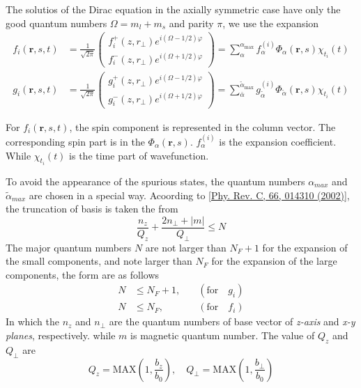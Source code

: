   The solutios of the Dirac equation in the axially symmetric case have only the good quantum numbers $\Omega = m_l + m_s$ and parity $\pi$, we use the expansion
  \begin{align}
      f_{i}(\boldsymbol{r}, s, t) &= \frac{1}{\sqrt{2 \pi}}
      \left(\begin{array}{l}
        f_{i}^{+}\left(z, r_{\perp}\right) e^{i(\Omega-1 / 2) \varphi} \\
        f_{i}^{-}\left(z, r_{\perp}\right) e^{i(\Omega+1 / 2) \varphi}
      \end{array}\right)
      =\sum_{\alpha}^{\alpha_{\max }} f_{\alpha}^{(i)} \Phi_{\alpha}(\boldsymbol{r}, s) \chi_{t_{i}}(t)  \label{oc_fi_hos} \\
      g_{i}(\boldsymbol{r}, s, t) &= \frac{1}{\sqrt{2 \pi}}
      \left(\begin{array}{l}
        g_{i}^{+}\left(z, r_{\perp}\right) e^{i(\Omega-1 / 2) \varphi} \\
        g_{i}^{-}\left(z, r_{\perp}\right) e^{i(\Omega+1 / 2) \varphi}
      \end{array}\right)
      =\sum_{\bar{\alpha}}^{\tilde{\alpha}_{\max }} g_{\tilde{\alpha}}^{(i)} \Phi_{\tilde{\alpha}}(\boldsymbol{r}, s) \chi_{t_{i}}(t) \label{oc_gi_hos}
  \end{align}
  \begin{note}
    For $f_i(\boldsymbol{r}, s, t)$, the spin component is represented in the column vector. The corresponding spin part is in the $\Phi_{\alpha}(\boldsymbol{r}, s)$. $f_{\alpha}^{(i)}$ is the expansion coefficient. While $\chi_{t_{i}}(t)$ is the time part of wavefunction.
  \end{note}
  To avoid the appearance of the spurious states, the quantum numbers $\alpha_{max}$ and $\tilde{\alpha}_{max}$ are chosen in a special way. Acoording to \href{https://journals.aps.org/prc/abstract/10.1103/PhysRevC.66.014310}{[Phy. Rev. C, 66, 014310 (2002)]}, the truncation of basis is taken the from
  \begin{equation}
    \frac{n_z}{Q_z} + \frac{2n_{\perp} + |m|}{Q_{\perp}} \leqslant N \label{oc_basis_truncate}
  \end{equation}
  The major quantum numbers $N$ are not larger than $N_F + 1$ for the expansion of the small components, and note larger than $N_F$ for the expansion of the large components, the form are as follows
  \begin{equation}
    \begin{aligned}
      N &\leqslant N_F + 1, \quad &(\text{for} \quad g_i) \\
      N &\leqslant N_F, \quad &(\text{for} \quad f_i)
    \end{aligned}
  \end{equation}
  In which the $n_z$ and $n_{\perp}$ are the quantum numbers of base vector of \textit{z-axis} and \textit{x-y planes}, respectively. while $m$ is magnetic quantum number. The value of $Q_{z}$ and $Q_{\perp}$ are
  \begin{equation}
    Q_z = \text{MAX}(1, \frac{b_z}{b_0}), \quad Q_{\perp} = \text{MAX}(1, \frac{b_{\perp}}{b_0})
  \end{equation}

